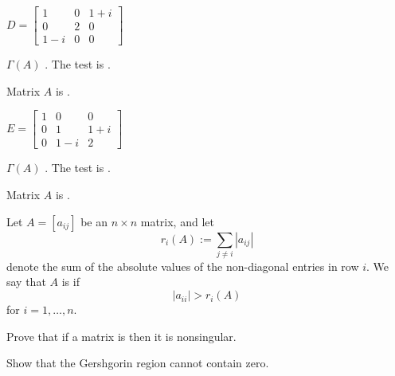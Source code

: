 \documentclass{ximera}
\begin{document}
\begin{problem}
\begin{problem}\label{prob:Gersh4}
$D = \left[ \begin{array}{ccc}
1 & 0 &  1 + i\\
0 & 2 & 0 \\
1 - i & 0 & 0
\end{array}\right]$

\begin{prompt}
$\Gamma (A)$ .  The test is .
\end{prompt}
\begin{problem}
Matrix $A$ is .
\end{problem}
\end{problem}

\begin{problem}\label{prob:Gersh5}
$E = \left[ \begin{array}{ccc}
1 & 0 & 0\\
0 & 1 & 1 + i\\
0 & 1 - i & 2
\end{array}\right]$

\begin{prompt}
$\Gamma (A)$ .  The test is .
\end{prompt}
\begin{problem}
Matrix $A$ is .
\end{problem}
\end{problem}
\end{problem}

\begin{problem}\label{prob:prove_diag_dom_nonsingular}
Let $A=[a_{ij}]$ be an $n\times n$ matrix, and let
$$
r_i(A):= \sum_{j \ne i} |a_{ij}|
$$
denote the sum of the absolute values of the non-diagonal entries in row $i$.  We say that $A$ is  if 
$$|a_{ii}|>r_i(A)$$
for $i=1,\dots , n$.

Prove that if a matrix is  
    then it is nonsingular.

    \begin{hint}
    Show that the Gershgorin region cannot contain zero.
    \end{hint}
\end{problem}
\end{document}
